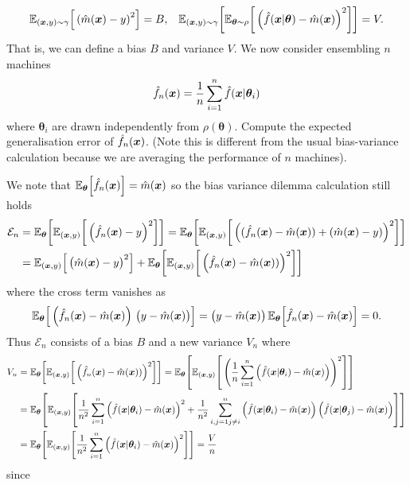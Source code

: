\documentclass{sotonExamBoxes}    %
\newcommand{\bra}[1]{\left(#1\right)}
\newcommand{\av}[2][\,]{\mathbb{E}_{#1}\!\left[ {\strut #2} \right]}
\begin{document}
\begin{question}{20}
\begin{qparts}
{\begin{align*}
        \av[(\bm{x},y)\sim\gamma]{\bra{\mm-y}^2} &= B,
        &
        \av[(\bm{x},y)\sim\gamma]{\av[\bm{\theta}\sim\rho]{\bra{\ml{}-\mm}^2}}
          = V.
      \end{align*}
      That is, we can define a bias $B$ and variance $V$.  We now
      consider ensembling $n$ machines
      \begin{align*}
        \hat{f}_n(\bm{x}) = \frac{1}{n} \sum_{i=1}^n \hat{f}(\bm{x}|\bm{\theta}_{i})
      \end{align*}
      where $\bm{\theta}_i$ are drawn independently from
      $\rho(\bm{\theta})$.  Compute the expected generalisation
      error of $\hat{f}_n(\bm{x})$. (Note this is different from the usual
      bias-variance calculation because we are averaging the
      performance of $n$ machines).
    }{}
    \begin{answer}
      We note that $\av[\bm{\theta}]{\mln} = \mm$ so the bias
      variance dilemma calculation still holds
      \begin{align*}
        \mathcal{E}_n
        &= \av[\bm{\theta}]{\av[(\bm{x}, y)]{\bra{\mln-y}^2}}
          = \av[\bm{\theta}]{\av[(\bm{x}, y)]{\bra{(\mln-\mm) +
          (\mm-y)}^2}}
        \\
          &= \av[(\bm{x}, y)]{\bra{\strut \mm-y}^2}
          + \av[\bm{\theta}]{\av[(\bm{x}, y)]{\bra{\mln-\mm)}^2}}
      \end{align*}
      where the cross term vanishes as
      \begin{align*}
        \av[\bm{\theta}]{\bra{\mln-\mm}\,\bra{\strut y-\mm}}
        = \bra{\strut y-\mm} \av[\bm{\theta}]{\mln-\mm} = 0.
      \end{align*}
      Thus $\mathcal{E}_n$ consists of a bias $B$ and a new variance
      $V_n$ where
      \begin{align*}
        V_n &=\av[\bm{\theta}]{\av[(\bm{x}, y)]{\bra{\mln-\mm)}^2}} =
              \av[\bm{\theta}]{\av[(\bm{x},y)]{\bra{\frac{1}{n}\sum_{i=1}^n
              \bra{\ml{i}-\mm}}^2}}
        \\
        &= \av[\bm{\theta}]{\av[(\bm{x},y)]{\frac{1}{n^2}\sum_{i=1}^n \bra{\ml{i}-\mm}^2
          + \frac{1}{n^2}\sum_{\substack{i,j=1}{j\neq i}}^n
          \bra{\ml{i}-\mm}\bra{\ml{j}-\mm }}}
        \\
            &=
              \av[\bm{\theta}]{\av[(\bm{x},y)]{\frac{1}{n^2}\sum_{i=1}^n
              \bra{\ml{i}-\mm}^2}} = \frac{V}{n}
      \end{align*}
      since
      \begin{align*}

\end{align*}
\end{answer}
\end{qparts}
\end{question}
\end{document}
